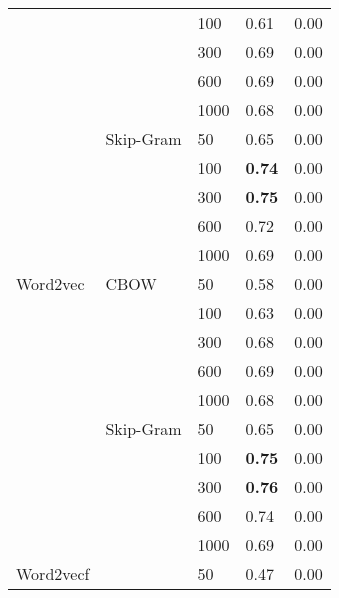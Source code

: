 \begin{table}[]
\begin{tabular}{@{}lllll@{}}
                 &               & 100  & 0.61             & 0.00                    \\
                 &               & 300  & 0.69             & 0.00                    \\
                 &               & 600  & 0.69             & 0.00                    \\
                 &               & 1000 & 0.68             & 0.00                    \\ \cmidrule(lr){2-5}
                 & Skip-Gram     & 50   & 0.65             & 0.00                    \\
                 &               & 100  & \textbf{0.74}    & 0.00                    \\
                 &               & 300  & \textbf{0.75}    & 0.00                    \\
                 &               & 600  & 0.72             & 0.00                    \\
                 &               & 1000 & 0.69             & 0.00                    \\ \cmidrule(r){1-5}
Word2vec         & CBOW          & 50   & 0.58             & 0.00                    \\
                 &               & 100  & 0.63             & 0.00                    \\
                 &               & 300  & 0.68             & 0.00                    \\
                 &               & 600  & 0.69             & 0.00                    \\
                 &               & 1000 & 0.68             & 0.00                    \\ \cmidrule(lr){2-5}
                 & Skip-Gram     & 50   & 0.65             & 0.00                    \\
                 &               & 100  & \textbf{0.75}    & 0.00                    \\
                 &               & 300  & \textbf{0.76}    & 0.00                    \\
                 &               & 600  & 0.74             & 0.00                    \\
                 &               & 1000 & 0.69             & 0.00                    \\ \cmidrule(r){1-5}
Word2vecf        &               & 50   & 0.47             & 0.00                    \\

\end{tabular}
\end{table}
